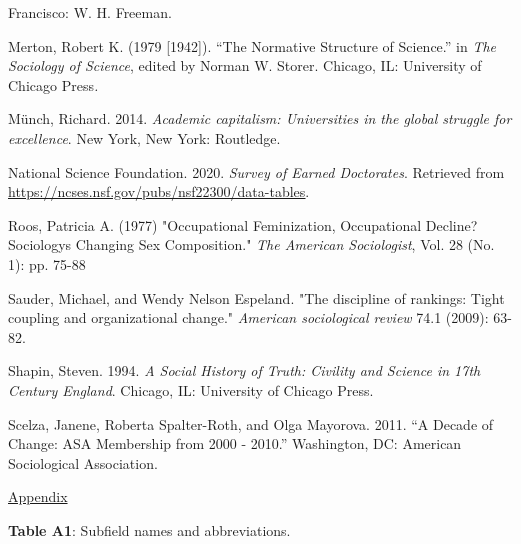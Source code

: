 \documentclass{article}
\begin{document}
Francisco: W. H. Freeman.

Merton, Robert K. (1979 {[}1942{]}). ``The Normative Structure of
Science.'' in \emph{The Sociology of Science}, edited by Norman W.
Storer. Chicago, IL: University of Chicago Press\emph{.}

Münch, Richard. 2014. \emph{Academic capitalism: Universities in the
global struggle for excellence}. New York, New York: Routledge.

National Science Foundation. 2020. \emph{Survey of Earned Doctorates}.
Retrieved from
\href{https://ncses.nsf.gov/pubs/nsf22300/data-tables}{\uline{https://ncses.nsf.gov/pubs/nsf22300/data-tables}}.

Roos, Patricia A. (1977) "Occupational Feminization, Occupational
Decline? Sociology\textquotesingle s Changing Sex Composition."
\emph{The American Sociologist}, Vol. 28 (No. 1): pp. 75-88

Sauder, Michael, and Wendy Nelson Espeland. "The discipline of rankings:
Tight coupling and organizational change." \emph{American sociological
review} 74.1 (2009): 63-82.

Shapin, Steven. 1994. \emph{A Social History of Truth: Civility and
Science in 17th Century England}. Chicago, IL: University of Chicago
Press.

Scelza, Janene, Roberta Spalter-Roth, and Olga Mayorova. 2011. ``A
Decade of Change: ASA Membership from 2000 - 2010.'' Washington, DC:
American Sociological Association.

\uline{Appendix}

\textbf{Table A1}: Subfield names and abbreviations.
\end{document}
